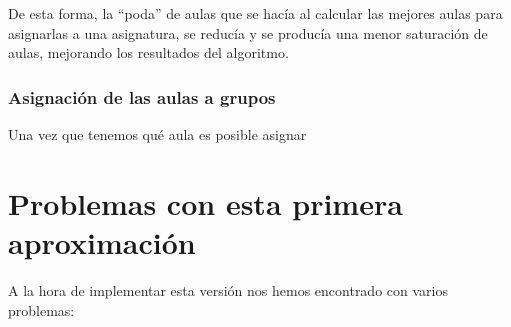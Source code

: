 De esta forma, la ``poda'' de aulas que se hacía al calcular las mejores aulas para asignarlas a una asignatura, se reducía y se producía una menor saturación de aulas, mejorando los resultados del algoritmo.

\subsubsection{Asignación de las aulas a grupos}

Una vez que tenemos qué aula es posible asignar

\section{Problemas con esta primera aproximación}
A la hora de implementar esta versión nos hemos encontrado con varios problemas:

